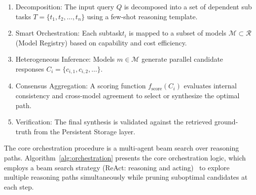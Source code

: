 \documentclass{iopjournal}
\newenvironment{algorithmic}[1][]{\begin{quote}\small}{\end{quote}}
\newcommand{\Require}{\textbf{Require:} }
\newcommand{\Ensure}{\textbf{Ensure:} }
\newcommand{\State}{\par\noindent}
\newcommand{\Comment}[1]{\hfill{\footnotesize(\textit{##1})}}
\newcommand{\For}[1]{\par\noindent\textbf{for} ##1 \textbf{do}}
\newcommand{\EndFor}{\par\noindent\textbf{end for}}
\newcommand{\If}[1]{\par\noindent\textbf{if} ##1 \textbf{then}}
\newcommand{\EndIf}{\par\noindent\textbf{end if}}
\newcommand{\Return}{\par\noindent\textbf{return} }
\begin{document}
\begin{enumerate}
    \item Decomposition: The input query $Q$ is decomposed into a set of dependent sub tasks $T = \{t_1, t_2, \ldots, t_n\}$ using a few-shot reasoning template.
    \item Smart Orchestration: Each subtask$t_i$ is mapped to a subset of models $\mathcal{M} \subset \mathcal{R}$ (Model Registry) based on capability and cost efficiency.
    \item Heterogeneous Inference: Models $m \in \mathcal{M}$ generate parallel candidate responses $C_i = \{c_{i,1}, c_{i,2}, \ldots\}$.
    \item Consensus Aggregation: A scoring function $f_{\text{score}}(C_i)$ evaluates internal consistency and cross-model agreement to select or synthesize the optimal path.
    \item Verification: The final synthesis is validated against the retrieved ground-truth from the Persistent Storage layer.
\end{enumerate}

The core orchestration procedure is a multi-agent beam search over reasoning paths. Algorithm~\ref{alg:orchestration} presents the core orchestration logic, which employs a beam search strategy (ReAct: reasoning and acting)~\cite{ReAct} to explore multiple reasoning paths simultaneously while pruning suboptimal candidates at each step.

\end{document}
